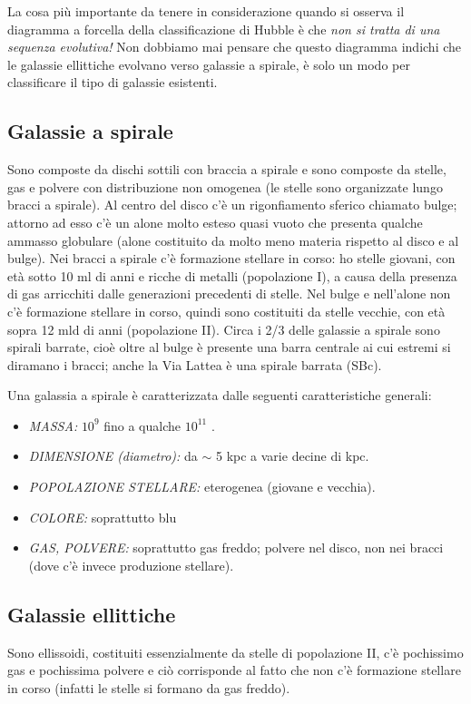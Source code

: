 La cosa più importante da tenere in considerazione quando si osserva il diagramma a forcella della classificazione di Hubble è che \emph{non si tratta di una sequenza evolutiva!} Non dobbiamo mai pensare che questo diagramma indichi che le galassie ellittiche evolvano verso galassie a spirale, è solo un modo per classificare il tipo di galassie esistenti. 

\subsection{Galassie a spirale} Sono composte da dischi sottili con braccia a spirale e sono composte da stelle, gas e polvere con distribuzione non omogenea (le stelle sono organizzate lungo bracci a spirale). Al centro del disco c’è un rigonfiamento sferico chiamato bulge; attorno ad esso c’è un alone molto esteso quasi vuoto che presenta qualche ammasso globulare (alone costituito da molto meno materia rispetto al disco e al bulge). Nei bracci a spirale c’è formazione stellare in corso: ho stelle giovani, con età sotto 10 ml di anni e ricche di metalli (popolazione I), a causa della presenza di gas arricchiti dalle generazioni precedenti di stelle. Nel bulge e nell’alone non c’è formazione stellare in corso, quindi sono costituiti da stelle vecchie, con età sopra 12 mld di anni (popolazione II). Circa i 2/3 delle galassie a spirale sono spirali barrate, cioè oltre al bulge è presente una barra centrale ai cui estremi si diramano i bracci; anche la Via Lattea è una spirale barrata (SBc).

Una galassia a spirale è caratterizzata dalle seguenti caratteristiche generali:
\begin{itemize}
    \item \emph{MASSA:} $10^9$ \unit{\solarmass{}} fino a qualche $10^{11}$ \unit{\solarmass{}}.
    \item \emph{DIMENSIONE (diametro):} da $\sim$ 5 kpc a varie decine di kpc. 
    \item \emph{POPOLAZIONE STELLARE:} eterogenea (giovane e vecchia).
    \item \emph{COLORE:} soprattutto blu
    \item \emph{GAS, POLVERE:} soprattutto gas freddo; polvere nel disco, non nei bracci (dove c'è invece produzione stellare).
\end{itemize}

\subsection{Galassie ellittiche} Sono ellissoidi, costituiti essenzialmente da stelle di popolazione II, c’è pochissimo gas e pochissima polvere e ciò corrisponde al fatto che non c’è formazione stellare in corso (infatti le stelle si formano da gas freddo).

